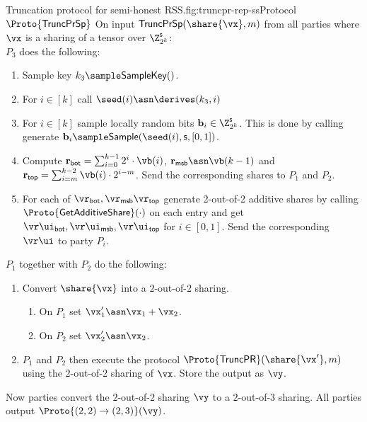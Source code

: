 \begin{Boxfig}{Truncation protocol for semi-honest
RSS.}{fig:truncpr-rep-ss}{Protocol $\Proto{\mathsf{TruncPrSp}}$}
On input
$\mathsf{TruncPrSp}(\share{\vx}, m)$ from all parties where $\vx$ is a sharing
of a tensor over $\Z_{2^k}^{\mathsf{s}}$: \\
$P_3$ does the following:
  \begin{enumerate}
    \item Sample key $k_3 \sample \mathsf{SampleKey}()$.
    \item For $i \in [k]$ call $\seed(i) \asn \derives(k_3, i)$
    \item For $i \in [k]$ sample locally random bits $\mathbf{b}_i \in \Z_{2^k}^{\mathsf{s}}$.
    This is done by calling
    generate $\mathbf{b}_i \sample \mathsf{Sample}(\seed(i), \mathsf{s}, [0,1])$.
    \item Compute
    $\mathbf{r}_{\mathsf{bot}} = \sum_{i=0}^{k-1}2^i \cdot \vb(i)$,
    $\mathbf{r}_{\mathsf{msb}} \asn \vb(k-1)$ and
    $\mathbf{r}_{\mathsf{top}} = \sum_{i=m}^{k-2} \vb(i) \cdot 2^{i-m}$. Send
    the corresponding shares to $P_1$ and $P_2$.
    \item For each of $\vr_{\mathsf{bot}}, \vr_{\mathsf{msb}} \vr_{\mathsf{top}}$
    generate 2-out-of-2 additive shares by calling $\Proto{\mathsf{GetAdditiveShare}}(\cdot)$
    on each entry and get $
    \vr\ui_{\mathsf{bot}}, \vr\ui_{\mathsf{msb}}, \vr\ui_{\mathsf{top}}$ for $i \in [0,1]$. Send the corresponding $\vr\ui$ to party $P_i$.
 \end{enumerate}
$P_1$ together with $P_2$ do the following:

\begin{enumerate}
   \item Convert $\share{\vx}$ into a $2$-out-of-$2$ sharing.
   \begin{enumerate}
      \item On $P_1$ set $\vx'_1 \asn \vx_1 + \vx_2$.
      \item On $P_2$ set $\vx'_2 \asn \vx_2$.
   \end{enumerate}

   \item $P_1$ and $P_2$ then execute the protocol $\Proto{\mathsf{TruncPR}}(\share{\vx'}, m)$
   using the $2$-out-of-$2$ sharing of $\vx$. Store the output as $\vy$.
\end{enumerate}

 Now parties convert the $2$-out-of-$2$ sharing $\vy$ to a $2$-out-of-$3$
 sharing. All parties output $\Proto{(2,2)\rightarrow(2,3)}(\vy)$.


\end{Boxfig}
